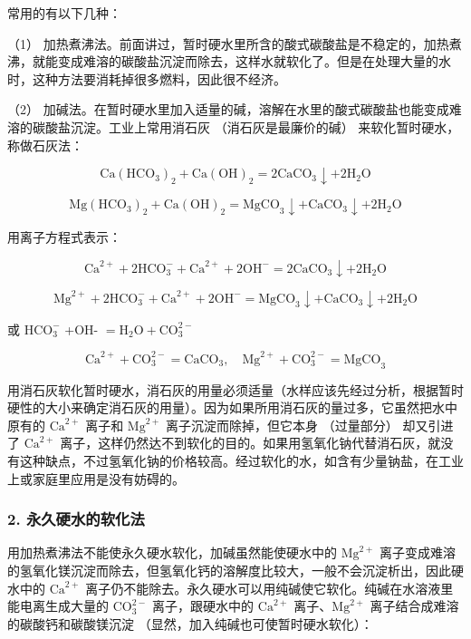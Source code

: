常用的有以下几种：

（1）
加热煮沸法。前面讲过，暂时硬水里所含的酸式碳酸盐是不稳定的，加热煮沸，就能变成难溶的碳酸盐沉淀而除去，这样水就软化了。但是在处理大量的水时，这种方法要消耗掉很多燃料，因此很不经济。

（2）
加碱法。在暂时硬水里加入适量的碱，溶解在水里的酸式碳酸盐也能变成难溶的碳酸盐沉淀。工业上常用消石灰
（消石灰是最廉价的碱） 来软化暂时硬水，称做石灰法：

\[
\mathrm{Ca} (\mathrm{HCO} _ {3}) _ {2} + \mathrm{Ca} (\mathrm{OH}) _ {2} = 2 \mathrm{CaCO} _ {3} \downarrow + 2 \mathrm{H} _ {2} \mathrm{O}
\]

\[
\mathrm{Mg} \left(\mathrm{HCO} _ {3}\right) _ {2} + \mathrm{Ca} (\mathrm{OH}) _ {2} = \mathrm{MgCO} _ {3} \downarrow + \mathrm{CaCO} _ {3} \downarrow + 2 \mathrm{H} _ {2} \mathrm{O}
\]

用离子方程式表示：

\[
\mathrm{Ca} ^{2+} + 2 \mathrm{HCO} _ {3} ^ {-} + \mathrm{Ca} ^{2+} + 2 \mathrm{OH} ^ {-} = 2 \mathrm{CaCO} _ {3} \downarrow + 2 \mathrm{H} _ {2} \mathrm{O}
\]

\[
\mathrm{Mg} ^{2+} + 2 \mathrm{HCO} _ {3} ^ {-} + \mathrm{Ca} ^{2+} + 2 \mathrm{OH} ^ {-} = \mathrm{MgCO} _ {3} \downarrow + \mathrm{CaCO} _ {3} \downarrow + 2 \mathrm{H} _ {2} \mathrm{O}
\]

或 \(\mathrm{HCO}_3^-\) +OH-
\(= \mathrm{H}_2\mathrm{O} + \mathrm{CO}_3^{2-}\)

\[
\mathrm{Ca} ^{2+} + \mathrm{CO} _ {3}^{2-} = \mathrm{CaCO} _ {3}, \quad \mathrm{Mg} ^{2+} + \mathrm{CO} _ {3}^{2-} = \mathrm{MgCO} _ {3}
\]

用消石灰软化暂时硬水，消石灰的用量必须适量（水样应该先经过分析，根据暂时硬性的大小来确定消石灰的用量）。因为如果所用消石灰的量过多，它虽然把水中原有的
\(\mathrm{Ca}^{2+}\) 离子和 \(\mathrm{Mg}^{2+}\)
离子沉淀而除掉，但它本身 （过量部分） 却又引进了 \(\mathrm{Ca}^{2+}\)
离子，这样仍然达不到软化的目的。如果用氢氧化钠代替消石灰，就没有这种缺点，不过氢氧化钠的价格较高。经过软化的水，如含有少量钠盐，在工业上或家庭里应用是没有妨碍的。

\subsubsection{2. 永久硬水的软化法}

用加热煮沸法不能使永久硬水软化，加碱虽然能使硬水中的
\(\mathrm{Mg}^{2+}\)
离子变成难溶的氢氧化镁沉淀而除去，但氢氧化钙的溶解度比较大，一般不会沉淀析出，因此硬水中的
\(\mathrm{Ca}^{2+}\)
离子仍不能除去。永久硬水可以用纯碱使它软化。纯碱在水溶液里能电离生成大量的
\(\mathrm{CO}_{3}^{2-}\) 离子，跟硬水中的 \(\mathrm{Ca}^{2+}\)
离子、\(\mathrm{Mg}^{2+}\) 离子结合成难溶的碳酸钙和碳酸镁沉淀
（显然，加入纯碱也可使暂时硬水软化）：

